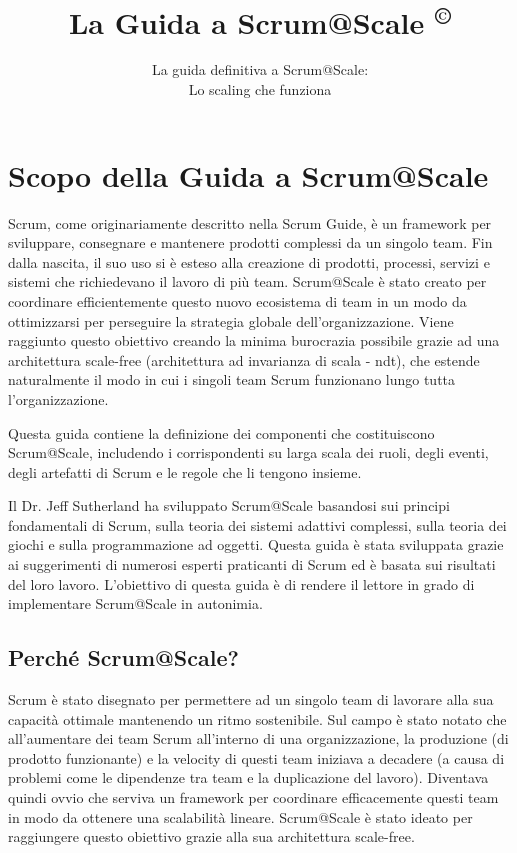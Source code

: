 \documentclass[12pt,a4paper,parskip=full]{scrartcl}
\title{\Huge{\color{red}\textbf{La Guida a Scrum@Scale
\textsuperscript{\copyright}
}}}
\subtitle{\color{gray}La guida definitiva a Scrum@Scale:\\ Lo scaling che funziona}
\date{}
\begin{document}

\section{Scopo della Guida a Scrum@Scale}
Scrum, come originariamente descritto nella Scrum Guide, è un 
framework per sviluppare, consegnare e mantenere prodotti complessi da 
un singolo team. Fin dalla nascita, il suo uso si è esteso alla creazione di 
prodotti, processi, servizi e sistemi che richiedevano il lavoro di più team.
Scrum@Scale è stato creato per coordinare efficientemente questo nuovo 
ecosistema di team in un modo da ottimizzarsi per perseguire la strategia 
globale dell'organizzazione. Viene raggiunto questo obiettivo creando la 
minima burocrazia possibile grazie ad una architettura scale-free (architettura ad invarianza di scala - ndt), che estende naturalmente il modo in cui i singoli team Scrum funzionano lungo tutta l'organizzazione.

Questa guida contiene la definizione dei componenti che costituiscono Scrum@Scale, includendo i corrispondenti su larga scala dei ruoli, degli eventi, degli artefatti di Scrum e le regole che li tengono insieme.

Il Dr. Jeff Sutherland ha sviluppato Scrum@Scale basandosi sui principi fondamentali di Scrum, sulla teoria dei sistemi adattivi complessi, sulla teoria dei giochi e sulla programmazione ad oggetti. Questa guida è stata sviluppata grazie ai suggerimenti di numerosi esperti praticanti di Scrum ed è basata sui risultati del loro lavoro. L'obiettivo di questa guida è di rendere il lettore in grado di implementare Scrum@Scale in autonimia.

\subsection{Perché Scrum@Scale?}
Scrum è stato disegnato per permettere ad un singolo team di lavorare 
alla sua capacità ottimale mantenendo un ritmo sostenibile. Sul campo è
stato notato che all'aumentare dei team Scrum all'interno di una organizzazione,
la produzione (di prodotto funzionante) e la velocity di questi team iniziava a
decadere (a causa di problemi come le dipendenze tra team e la duplicazione
del lavoro). Diventava quindi ovvio che serviva un framework per coordinare 
efficacemente questi team in modo da ottenere una scalabilità lineare.
Scrum@Scale è stato ideato per raggiungere questo obiettivo grazie alla
sua architettura scale-free.
\end{document}
